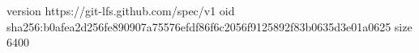 version https://git-lfs.github.com/spec/v1
oid sha256:b0afea2d256fe890907a75576efdf86f6c2056f9125892f83b0635d3e01a0625
size 6400
